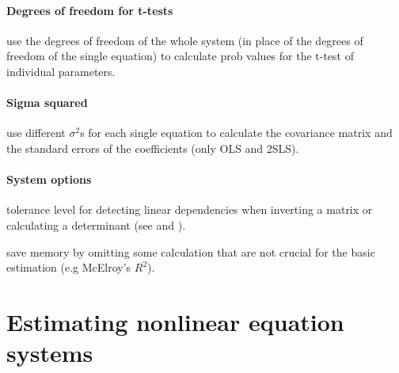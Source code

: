 \documentclass[article]{jss}
\begin{document}
\paragraph{Degrees of freedom for t-tests}   
 use the degrees of freedom of the whole system
   (in place of the degrees of freedom of the single equation)
   to calculate prob values for the t-test of individual parameters.

\paragraph{Sigma squared}   
 use different $\sigma^2$s for each
   single equation to calculate the covariance matrix and the
   standard errors of the coefficients (only OLS and 2SLS).

\paragraph{System options}   

 tolerance level for detecting linear dependencies
   when inverting a matrix or calculating a determinant (see
    and ).

 save memory by omitting some calculation that
   are not crucial for the basic estimation (e.g McElroy's
   $R^2$).



\section{Estimating nonlinear equation systems}
\end{document}

